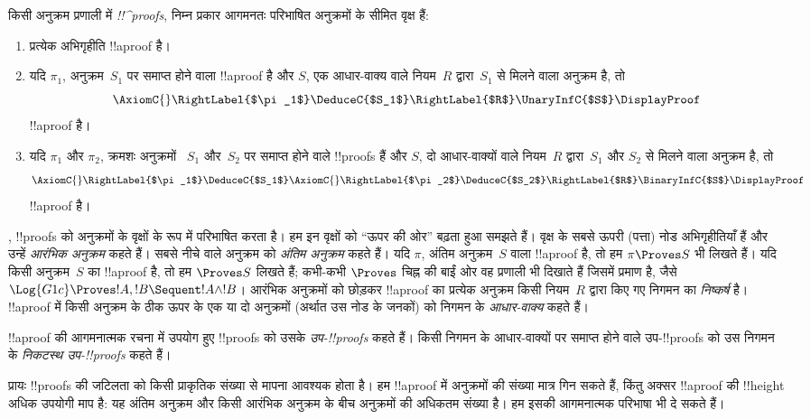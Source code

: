 \documentclass[../../../include/open-logic-section]{subfiles}
\begin{document}
\begin{defn}
किसी अनुक्रम प्रणाली में \emph{!!^{proof}s}, निम्न प्रकार आगमनतः परिभाषित
अनुक्रमों के सीमित वृक्ष हैं:
\begin{enumerate}
  \item{} प्रत्येक अभिगृहीति !!a{proof} है।
  \item{} यदि $\pi_1$, अनुक्रम~$S_1$ पर समाप्त
  होने वाला !!a{proof} है और $S$, एक आधार-वाक्य वाले नियम~$R$ द्वारा~$S_1$
  से मिलने वाला अनुक्रम है, तो
  \[
  \AxiomC{}
  \RightLabel{$\pi_1$}
  \DeduceC{$S_1$}
  \RightLabel{$R$}
  \UnaryInfC{$S$}
  \DisplayProof
  \]
  !!a{proof} है।
  \item{} यदि $\pi_1$ और $\pi_2$, क्रमशः अनुक्रमों
  ~$S_1$ और~$S_2$ पर समाप्त होने वाले !!{proof}s हैं और $S$, दो आधार-वाक्यों
  वाले नियम~$R$ द्वारा~$S_1$ और $S_2$ से मिलने वाला अनुक्रम है, तो
  \[
  \AxiomC{}
  \RightLabel{$\pi_1$}
  \DeduceC{$S_1$}
  \AxiomC{}
  \RightLabel{$\pi_2$}
  \DeduceC{$S_2$}
  \RightLabel{$R$}
  \BinaryInfC{$S$}
  \DisplayProof
  \]
  !!a{proof} है।
\end{enumerate}
\end{defn}

, !!{proof}s को अनुक्रमों के वृक्षों के रूप में परिभाषित
करता है। हम इन वृक्षों को ``ऊपर की ओर'' बढ़ता हुआ समझते हैं। वृक्ष के सबसे
ऊपरी (पत्ता) नोड अभिगृहीतियाँ हैं और उन्हें \emph{आरंभिक अनुक्रम} कहते हैं।
सबसे नीचे वाले अनुक्रम को \emph{अंतिम अनुक्रम} कहते हैं। यदि $\pi$, अंतिम
अनुक्रम~$S$ वाला !!a{proof} है, तो हम $\pi \Proves S$ भी लिखते हैं। यदि
किसी अनुक्रम~$S$ का !!a{proof} है, तो हम $\Proves S$ लिखते हैं; कभी-कभी
$\Proves$ चिह्न की बाईं ओर वह प्रणाली भी दिखाते हैं जिसमें प्रमाण है, जैसे
$\Log{G1c} \Proves !A, !B \Sequent !A \land !B$। आरंभिक अनुक्रमों को छोड़कर
!!a{proof} का प्रत्येक अनुक्रम किसी नियम~$R$ द्वारा किए गए निगमन का
\emph{निष्कर्ष} है। !!a{proof} में किसी अनुक्रम के ठीक ऊपर के एक या दो
अनुक्रमों (अर्थात उस नोड के जनकों) को निगमन के \emph{आधार-वाक्य} कहते हैं।

!!a{proof} की आगमनात्मक रचना में उपयोग हुए !!{proof}s को उसके
\emph{उप-!!{proof}s} कहते हैं। किसी निगमन के आधार-वाक्यों पर समाप्त होने वाले
उप-!!{proof}s को उस निगमन के \emph{निकटस्थ उप-!!{proof}s} कहते हैं।

प्रायः !!{proof}s की जटिलता को किसी प्राकृतिक संख्या से मापना आवश्यक होता
है। हम !!a{proof} में अनुक्रमों की संख्या मात्र गिन सकते हैं, किंतु अक्सर
!!a{proof} की !!{height} अधिक उपयोगी माप है: यह अंतिम अनुक्रम और किसी आरंभिक
अनुक्रम के बीच अनुक्रमों की अधिकतम संख्या है। हम इसकी आगमनात्मक परिभाषा भी
दे सकते हैं।
\end{document}

